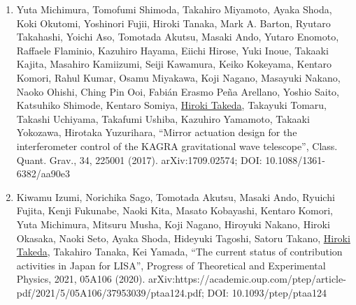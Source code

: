 \documentclass[uplatex, 12pt]{article}
\begin{document}
\begin{enumerate}
\item Yuta Michimura, Tomofumi Shimoda, Takahiro Miyamoto, Ayaka Shoda, Koki Okutomi, Yoshinori Fujii, Hiroki Tanaka, Mark A. Barton, Ryutaro Takahashi, Yoichi Aso, Tomotada Akutsu, Masaki Ando, Yutaro Enomoto, Raffaele Flaminio, Kazuhiro Hayama, Eiichi Hirose, Yuki Inoue, Takaaki Kajita, Masahiro Kamiizumi, Seiji Kawamura, Keiko Kokeyama, Kentaro Komori, Rahul Kumar, Osamu Miyakawa, Koji Nagano, Masayuki Nakano, Naoko Ohishi, Ching Pin Ooi, Fabián Erasmo Peña Arellano, Yoshio Saito, Katsuhiko Shimode, Kentaro Somiya, \uline{Hiroki Takeda}, Takayuki Tomaru, Takashi Uchiyama, Takafumi Ushiba, Kazuhiro Yamamoto, Takaaki Yokozawa, Hirotaka Yuzurihara, “Mirror actuation design for the interferometer control of the KAGRA gravitational wave telescope”, Class. Quant. Grav., 34, 225001 (2017). arXiv:1709.02574; DOI: 10.1088/1361-6382/aa90e3
\item Kiwamu Izumi, Norichika Sago, Tomotada Akutsu, Masaki Ando, Ryuichi Fujita, Kenji Fukunabe, Naoki Kita, Masato Kobayashi, Kentaro Komori, Yuta Michimura, Mitsuru Musha, Koji Nagano, Hiroyuki Nakano, Hiroki Okasaka, Naoki Seto, Ayaka Shoda, Hideyuki Tagoshi, Satoru Takano, \uline{Hiroki Takeda}, Takahiro Tanaka, Kei Yamada, “The current status of contribution activities in Japan for LISA”, Progress of Theoretical and Experimental Physics, 2021, 05A106 (2020). arXiv:https://academic.oup.com/ptep/article-pdf/2021/5/05A106/37953039/ptaa124.pdf; DOI: 10.1093/ptep/ptaa124
\end{enumerate}
\end{document}
